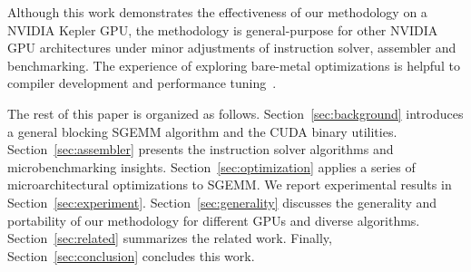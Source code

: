Although this work demonstrates the effectiveness of our methodology on a NVIDIA Kepler GPU, the methodology is general-purpose for 
other NVIDIA GPU architectures under minor adjustments of instruction solver, assembler and benchmarking.
The experience of 
exploring bare-metal optimizations is helpful to compiler development and performance tuning~\cite{artifact}.

The rest of this paper is organized as follows. Section~\ref{sec:background} introduces 
a general blocking SGEMM algorithm and the CUDA binary utilities.
Section~\ref{sec:assembler} presents the instruction solver algorithms and
microbenchmarking 
insights. Section~\ref{sec:optimization} applies a series of microarchitectural optimizations to SGEMM. We report 
experimental results in Section~\ref{sec:experiment}.
Section~\ref{sec:generality} discusses the generality and portability of our methodology for different GPUs and diverse algorithms.
Section~\ref{sec:related} summarizes the related work. Finally, 
Section~\ref{sec:conclusion} concludes this work. 
